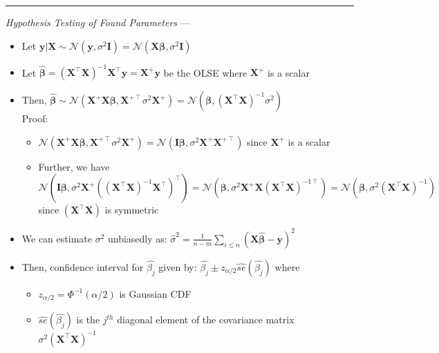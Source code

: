 {\color{lightgray}\hrule height 0.001mm}

\emph{Hypothesis Testing of Found Parameters} --- 
\begin{itemize}
    \item Let $\boldsymbol{y} | \boldsymbol{X} \sim \mathcal{N} (\boldsymbol{y}, \sigma^2 \boldsymbol{I}) = \mathcal{N} (\boldsymbol{X} \boldsymbol{\beta}, \sigma^2 \boldsymbol{I})$
    \item Let $\boldsymbol{\hat{\beta}} = (\boldsymbol{X}^\intercal \boldsymbol{X})^{-1}  \boldsymbol{X}^\intercal \boldsymbol{y} = \boldsymbol{X}^+ \boldsymbol{y}$ be the OLSE where $\boldsymbol{X}^+$ is a scalar
    \item Then, $\boldsymbol{\hat{\beta}} \sim \mathcal{N}( \boldsymbol{X}^+ \boldsymbol{X} \boldsymbol{\beta}, \boldsymbol{X}^{+ \intercal} \sigma^2 \boldsymbol{X}^+ ) = \mathcal{N}( \boldsymbol{\beta}, (\boldsymbol{X}^\intercal \boldsymbol{X})^{-1} \sigma^2 )$\\Proof:
    \begin{itemize}
        \item $\mathcal{N}( \boldsymbol{X}^+ \boldsymbol{X} \boldsymbol{\beta}, \boldsymbol{X}^{+ \intercal} \sigma^2 \boldsymbol{X}^+ ) = \mathcal{N}( \boldsymbol{I} \boldsymbol{\beta}, \sigma^2 \boldsymbol{X}^+ \boldsymbol{X}^{+ \intercal}  )$ since $\boldsymbol{X}^+$ is a scalar
        \item Further, we have $\mathcal{N}( \boldsymbol{I} \boldsymbol{\beta}, \sigma^2 \boldsymbol{X}^+ ((\boldsymbol{X}^\intercal \boldsymbol{X})^{-1}  \boldsymbol{X}^\intercal)^\intercal  ) = \mathcal{N}( \boldsymbol{\beta}, \sigma^2 \boldsymbol{X}^+ \boldsymbol{X} (\boldsymbol{X}^\intercal \boldsymbol{X})^{-1 \intercal}  ) = \mathcal{N}( \boldsymbol{\beta}, \sigma^2 (\boldsymbol{X}^\intercal \boldsymbol{X})^{-1}  )$ since $(\boldsymbol{X}^\intercal \boldsymbol{X})$ is symmetric
    \end{itemize}
    \item We can estimate $\sigma^2$ unbiasedly as: $\hat{\sigma}^2 = \frac{1}{n-m} \sum_{i \leq n} (\boldsymbol{X} \boldsymbol{\hat{\beta}} - \boldsymbol{y})^2$
    \item Then, confidence interval for $\hat{\beta_j}$ given by: $\hat{\beta_j} \pm z_{\alpha/2} \hat{se}(\hat{\beta_j})$ where 
    \begin{itemize}
        \item $z_{\alpha/2} = \Phi^{-1}(\alpha/2)$ is Gaussian CDF
        \item $\hat{se}(\hat{\beta_j})$ is the $j^{th}$ diagonal element of the covariance matrix $\sigma^2 (\boldsymbol{X}^\intercal \boldsymbol{X})^{-1}$

\end{itemize}
\end{itemize}
